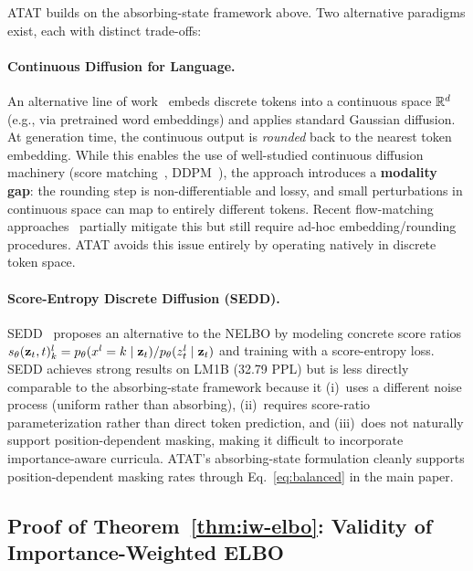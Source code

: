 ATAT builds on the absorbing-state framework above. Two alternative paradigms exist, each with distinct trade-offs:

\paragraph{Continuous Diffusion for Language.} An alternative line of work~\citep{li2022diffusion,gong2023diffuseq,gulrajani2024likelihood,dieleman2022continuous} embeds discrete tokens into a continuous space $\mathbb{R}^d$ (e.g., via pretrained word embeddings) and applies standard Gaussian diffusion. At generation time, the continuous output is \emph{rounded} back to the nearest token embedding. While this enables the use of well-studied continuous diffusion machinery (score matching~\citep{score_sde}, DDPM~\citep{ddpm}), the approach introduces a \textbf{modality gap}: the rounding step is non-differentiable and lossy, and small perturbations in continuous space can map to entirely different tokens. Recent flow-matching approaches~\citep{zhang2024language,hu2024flow} partially mitigate this but still require ad-hoc embedding/rounding procedures. ATAT avoids this issue entirely by operating natively in discrete token space.

\paragraph{Score-Entropy Discrete Diffusion (SEDD).} SEDD~\citep{sedd} proposes an alternative to the NELBO by modeling concrete score ratios $s_\theta(\mathbf{z}_t, t)_k^l = p_\theta(x^l = k \mid \mathbf{z}_t) / p_\theta(z_t^l \mid \mathbf{z}_t)$ and training with a score-entropy loss. SEDD achieves strong results on LM1B (32.79 PPL) but is less directly comparable to the absorbing-state framework because it (i)~uses a different noise process (uniform rather than absorbing), (ii)~requires score-ratio parameterization rather than direct token prediction, and (iii)~does not naturally support position-dependent masking, making it difficult to incorporate importance-aware curricula. ATAT's absorbing-state formulation cleanly supports position-dependent masking rates through Eq.~\ref{eq:balanced} in the main paper.

\subsection{Proof of Theorem~\ref{thm:iw-elbo}: Validity of Importance-Weighted ELBO}
\label{app:elbo-proof}

